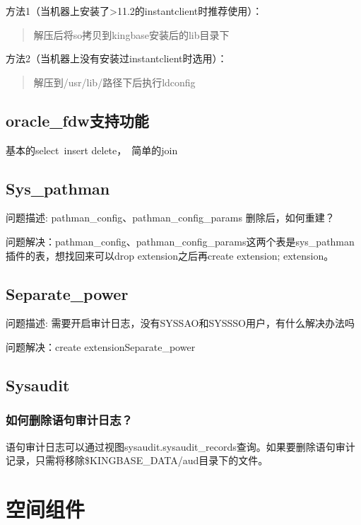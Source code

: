 \documentclass[a4,10pt,oneside,english]{sphinxmanual}
\begin{document}
方法1（当机器上安装了>11.2的instantclient时推荐使用）：
\begin{quote}

解压后将so拷贝到kingbase安装后的lib目录下
\end{quote}

方法2（当机器上没有安装过instantclient时选用）：
\begin{quote}

解压到/usr/lib/路径下后执行ldconfig
\end{quote}


\section{oracle\_fdw支持功能}
\label{\detokenize{extended-plug-in:id3}}
基本的select insert delete， 简单的join


\section{Sys\_pathman}
\label{\detokenize{extended-plug-in:sys-pathman}}
问题描述: pathman\_config、pathman\_config\_params 删除后，如何重建？

问题解决：pathman\_config、pathman\_config\_params这两个表是sys\_pathman插件的表，想找回来可以drop extension之后再create extension; extension。


\section{Separate\_power}
\label{\detokenize{extended-plug-in:separate-power}}
问题描述: 需要开启审计日志，没有SYSSAO和SYSSSO用户，有什么解决办法吗

问题解决：create extensionSeparate\_power


\section{Sysaudit}
\label{\detokenize{extended-plug-in:sysaudit}}

\subsection{如何删除语句审计日志？}
\label{\detokenize{extended-plug-in:id4}}
语句审计日志可以通过视图sysaudit.sysaudit\_records查询。如果要删除语句审计记录，只需将移除\$KINGBASE\_DATA/aud目录下的文件。


\chapter{空间组件}
\label{\detokenize{gis:id1}}\label{\detokenize{gis::doc}}
\end{document}

